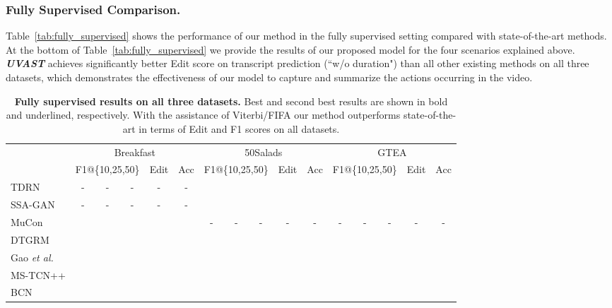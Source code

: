 \subsubsection{Fully Supervised Comparison.}
Table~\ref{tab:fully_supervised} shows the performance of our method in the fully supervised setting compared with state-of-the-art methods.
At the bottom of Table~\ref{tab:fully_supervised} we provide the results of our proposed model for the four scenarios explained above. 
\textit{\textbf{UVAST}} achieves significantly better Edit score on transcript prediction (``w/o duration") than all other existing methods on all three datasets, which demonstrates the effectiveness of our model to capture and summarize the actions occurring in the video. 
\begin{table}[t]
\centering
\caption{\textbf{Fully supervised results on all three datasets.} Best and second best results are shown in bold and underlined, respectively. With the assistance of Viterbi/FIFA our method outperforms state-of-the-art in terms of Edit and F1 scores on all datasets.}
\resizebox{\textwidth}{!} {
\begin{tabular}{ll|ccc|c|c||ccc|c|c||ccc|c|c}
\hline 
\hline 
\multicolumn{2}{l|}{} & \multicolumn{5}{c||}{{Breakfast}} & \multicolumn{5}{c||}{{50Salads}} & \multicolumn{5}{c}{{GTEA}}\\
\cline{3-17} 
 &  & \multicolumn{3}{c|}{{F1@\{10,25,50\}}} & Edit & Acc & \multicolumn{3}{c|}{{F1@\{10,25,50\}}} & Edit & Acc & \multicolumn{3}{c|}{{F1@\{10,25,50\}}} & Edit & Acc \\
\hline 
\multicolumn{2}{l|}{TDRN \cite{lei2018temporal}} & - & - & - & - & - &  &  &  &  &  &  &  &  &  &  \\
\multicolumn{2}{l|}{SSA-GAN \cite{gammulle2020fine}} & - & - & - & - & - &  &  &  &  &  &  &  &  &  & \\
\multicolumn{2}{l|}{MuCon \cite{Souri:2021:MuCon}} &  &  &  &  &  & - & - & - & - & - & - & - & - & - & -\\
\multicolumn{2}{l|}{{DTGRM \cite{wang2020temporal}}} &  &  &  &  &  &  &  &  &  &  &  &  &  &  & \\
\multicolumn{2}{l|}{Gao  \textit{et al.} \cite{gao2021global2local}} &  &  &  &  &  &  &  &  &  &  &  &  &  &  & \\
\multicolumn{2}{l|}{MS-TCN++ \cite{li2020ms}} &  &  &  &  &  &  &  &  &  &  &  &  &  &  & \\
\multicolumn{2}{l|}{BCN \cite{wang2020boundary}} &  &  &  &  &  &  &  &  &  &  &  &  &  &  & \\

\end{tabular}}
\end{table}
